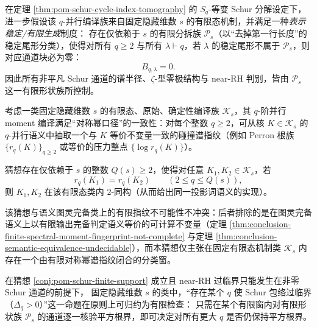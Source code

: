 \begin{conjecture}\label{conj:pom-schur-finite-support}
在定理 \ref{thm:pom-schur-cycle-index-tomography} 的 \(S_q\)-等变 Schur 分解设定下，
进一步假设该 \(q\)-并行编译族来自固定隐藏维数 \(s\) 的有限态机制，并满足一种\emph{表示稳定/有限生成}制度：
存在仅依赖于 \(s\) 的有限分拆族 \(\mathcal{P}_s\)（以“去掉第一行长度”的稳定尾形分类），使得对所有 \(q\ge2\) 与所有 \(\lambda\vdash q\)，若 \(\lambda\) 的稳定尾形不属于 \(\mathcal{P}_s\)，则对应通道块必为零：
\[
B_{q,\lambda}=0.
\]
因此所有非平凡 Schur 通道的谱半径、\(\zeta\)-型零极结构与 near-RH 判别，皆由 \(\mathcal{P}_s\) 这一有限形状族所控制。
\end{conjecture}

\begin{conjecture}\label{conj:pom-sympower-collision-spectrum-rigidity}
考虑一类固定隐藏维数 \(s\) 的有限态、原始、确定性编译族 \(\mathcal K_s\)，其 \(q\)-阶并行 moment 编译满足“对称幂口径”的一致性：对每个整数 \(q\ge 2\)，可从核 \(K\in\mathcal K_s\) 的 \(q\)-并行语义中抽取一个与 \(K\) 等价不变量一致的碰撞谱指纹（例如 Perron 根族 \(\{r_q(K)\}_{q\ge 2}\) 或等价的压力整点 \(\{\log r_q(K)\}\)）。
\par
猜想存在仅依赖于 \(s\) 的整数 \(Q(s)\ge 2\)，使得对任意 \(K_1,K_2\in\mathcal K_s\)，若
\[
r_q(K_1)=r_q(K_2)\qquad(2\le q\le Q(s)),
\]
则 \(K_1,K_2\) 在该有限态类内 \(2\)-同构（从而给出同一投影词语义的实现）。
\par
该猜想与语义图灵完备类上的有限指纹不可能性不冲突：后者排除的是在图灵完备语义上以有限输出完备判定语义等价的可计算不变量（定理 \ref{thm:conclusion-finite-spectral-moment-fingerprint-not-complete} 与定理 \ref{thm:conclusion-semantic-equivalence-undecidable}），而本猜想仅主张在固定有限态机制类 \(\mathcal K_s\) 内存在一个由有限对称幂谱指纹闭合的分类窗。
\end{conjecture}

\begin{corollary}\label{cor:pom-schur-near-rh-finite-check}
在猜想 \ref{conj:pom-schur-finite-support} 成立且 near-RH 过临界只能发生在非零 Schur 通道的前提下，
固定隐藏维数 \(s\) 的类中，“存在某个 \(q\) 使 Schur 包络过临界（\(\Delta_q>0\)）”这一命题在原则上可归约为有限检查：
只需在某个有限窗内对有限形状族 \(\mathcal{P}_s\) 的通道逐一核验平方根界，即可决定对所有更大 \(q\) 是否仍保持平方根界。
\end{corollary}

